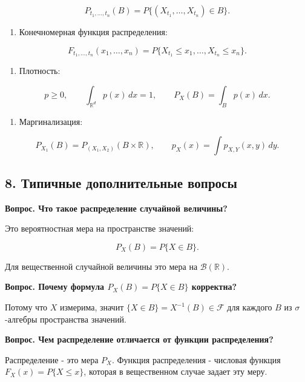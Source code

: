 \documentclass[
  11pt,
  a4paper,
]{article}
\providecommand{\tightlist}{%
  \setlength{\itemsep}{0pt}\setlength{\parskip}{0pt}}
\begin{document}
\[
P_{t_1,\ldots,t_n}(B)
=
P\{(X_{t_1},\ldots,X_{t_n})\in B\}.
\]

\begin{enumerate}
\def\labelenumi{\arabic{enumi}.}
\setcounter{enumi}{4}
\tightlist
\item
  Конечномерная функция распределения:
\end{enumerate}

\[
F_{t_1,\ldots,t_n}(x_1,\ldots,x_n)
=
P\{X_{t_1}\le x_1,\ldots,X_{t_n}\le x_n\}.
\]

\begin{enumerate}
\def\labelenumi{\arabic{enumi}.}
\setcounter{enumi}{5}
\tightlist
\item
  Плотность:
\end{enumerate}

\[
p\ge0,\qquad
\int_{\mathbb R^d}p(x)\,dx=1,\qquad
P_X(B)=\int_Bp(x)\,dx.
\]

\begin{enumerate}
\def\labelenumi{\arabic{enumi}.}
\setcounter{enumi}{6}
\tightlist
\item
  Маргинализация:
\end{enumerate}

\[
P_{X_1}(B)=P_{(X_1,X_2)}(B\times\mathbb R),
\qquad
p_X(x)=\int p_{X,Y}(x,y)\,dy.
\]

\subsection{8. Типичные дополнительные
вопросы}\label{ux442ux438ux43fux438ux447ux43dux44bux435-ux434ux43eux43fux43eux43bux43dux438ux442ux435ux43bux44cux43dux44bux435-ux432ux43eux43fux440ux43eux441ux44b}

\textbf{Вопрос. Что такое распределение случайной величины?}

Это вероятностная мера на пространстве значений:

\[
P_X(B)=P\{X\in B\}.
\]

Для вещественной случайной величины это мера на
\(\mathcal B(\mathbb R)\).

\textbf{Вопрос. Почему формула \(P_X(B)=P\{X\in B\}\) корректна?}

Потому что \(X\) измерима, значит \(\{X\in B\}=X^{-1}(B)\in\mathcal F\)
для каждого \(B\) из \(\sigma\)-алгебры пространства значений.

\textbf{Вопрос. Чем распределение отличается от функции распределения?}

Распределение - это мера \(P_X\). Функция распределения - числовая
функция \(F_X(x)=P\{X\le x\}\), которая в вещественном случае задает эту
меру.
\end{document}
